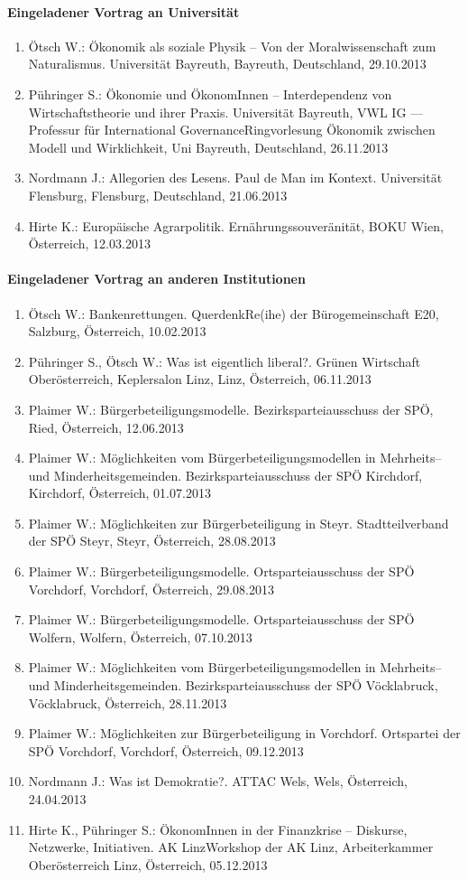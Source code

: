 \paragraph{Eingeladener Vortrag an Universität}
\begin{enumerate}
	\item Ötsch W.: Ökonomik als soziale Physik – Von der Moralwissenschaft zum Naturalismus. Universität Bayreuth, Bayreuth, Deutschland, 29.10.2013
	\item Pühringer S.: Ökonomie und ÖkonomInnen -- Interdependenz von Wirtschaftstheorie und ihrer Praxis. Universität Bayreuth, VWL IG — Professur für International GovernanceRingvorlesung Ökonomik zwischen Modell und Wirklichkeit, Uni Bayreuth, Deutschland, 26.11.2013
	\item Nordmann J.: Allegorien des Lesens. Paul de Man im Kontext. Universität Flensburg, Flensburg, Deutschland, 21.06.2013
	\item Hirte K.: Europäische Agrarpolitik. Ernährungssouveränität, BOKU Wien, Österreich, 12.03.2013
\end{enumerate}
\paragraph{Eingeladener Vortrag an anderen Institutionen}
\begin{enumerate}
	\item Ötsch W.: Bankenrettungen. QuerdenkRe(ihe) der Bürogemeinschaft E20, Salzburg, Österreich, 10.02.2013
	\item Pühringer S., Ötsch W.: Was ist eigentlich liberal?. Grünen Wirtschaft Oberösterreich, Keplersalon Linz, Linz, Österreich, 06.11.2013
	\item Plaimer W.: Bürgerbeteiligungsmodelle. Bezirksparteiausschuss  der SPÖ, Ried, Österreich, 12.06.2013
	\item Plaimer W.: Möglichkeiten vom Bürgerbeteiligungsmodellen in Mehrheits-- und Minderheitsgemeinden. Bezirksparteiausschuss der SPÖ Kirchdorf, Kirchdorf, Österreich, 01.07.2013
	\item Plaimer W.: Möglichkeiten zur Bürgerbeteiligung in Steyr. Stadtteilverband  der SPÖ Steyr, Steyr, Österreich, 28.08.2013
	\item Plaimer W.: Bürgerbeteiligungsmodelle. Ortsparteiausschuss  der SPÖ Vorchdorf, Vorchdorf, Österreich, 29.08.2013
	\item Plaimer W.: Bürgerbeteiligungsmodelle. Ortsparteiausschuss der SPÖ Wolfern, Wolfern, Österreich, 07.10.2013
	\item Plaimer W.: Möglichkeiten vom Bürgerbeteiligungsmodellen in Mehrheits-- und Minderheitsgemeinden. Bezirksparteiausschuss der SPÖ Vöcklabruck, Vöcklabruck, Österreich, 28.11.2013
	\item Plaimer W.: Möglichkeiten zur Bürgerbeteiligung in Vorchdorf. Ortspartei  der SPÖ Vorchdorf, Vorchdorf, Österreich, 09.12.2013
	\item Nordmann J.: Was ist Demokratie?. ATTAC Wels, Wels, Österreich, 24.04.2013
	\item Hirte K., Pühringer S.: ÖkonomInnen in der Finanzkrise -- Diskurse, Netzwerke, Initiativen. AK LinzWorkshop der AK Linz, Arbeiterkammer Oberösterreich Linz, Österreich, 05.12.2013
\end{enumerate}
